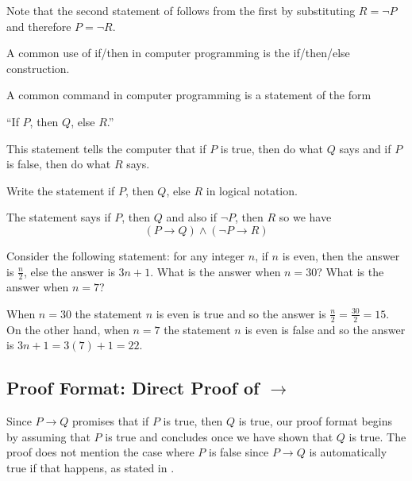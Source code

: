 Note that the second statement of  follows from the first by substituting $R = \neg P$ and therefore $P = \neg R$.

A common use of if/then in computer programming is the if/then/else construction.

\begin{exam}
\label{exam_if_then_else} 
    A common command in computer programming is a statement of the form
         \begin{center}
             ``If $P$, then $Q$, else $R$.''
         \end{center}
    This statement tells the computer that if $P$ is true, then do what $Q$ says and if $P$ is false, then do what $R$ says.
        \begin{apart}
            \item Write the statement if $P$, then $Q$, else $R$ in logical notation.
                \begin{soln}
                    The statement says if $P$, then $Q$ and also if $\neg P$, then $R$ so we have 
                        $$(P \to Q) \land (\neg P \to R)$$
                \end{soln}
            \item Consider the following statement: for any integer $n$, if $n$ is even, then the answer is $\frac{n}{2}$, else the answer is $3n+1$.  What is the answer when $n=30$?  What is the answer when $n = 7$?
                \begin{soln}
                    When $n=30$ the statement $n$ is even is true and so the answer is $\frac{n}{2}=\frac{30}{2} = 15$.  On the other hand, when $n=7$ the statement $n$ is even is false and so the answer is $3n+1 = 3(7)+1 = 22$.
                \end{soln}
        \end{apart}  
\end{exam}

\newcommand{\subpffifthen}{Proof Format: Direct Proof of $\to$}
\subsection{\subpffifthen}
\label{sub_pff_if_then}

Since $P \to Q$ promises that if $P$ is true, then $Q$ is true, our proof format begins by assuming that $P$ is true and concludes once we have shown that $Q$ is true.  The proof does not mention the case where $P$ is false since $P \to Q$ is automatically true if that happens, as stated in .

